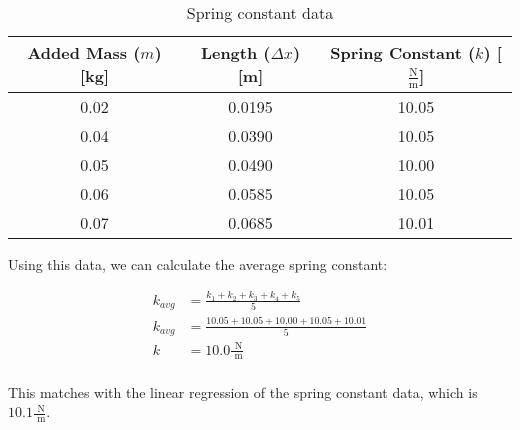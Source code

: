 \documentclass{article}
\begin{document}
            
            \begin{table}[H]
                \centering
                \begin{tabular}{|c|c|c|}
                    \hline
                    Added Mass ($m$) [kg] & Length ($\Delta x$) [m] & Spring Constant ($k$) [$\frac{\text{N}}{\text{m}}$] \\
                    \hline
                    0.02                  & 0.0195                  & 10.05                                               \\
                    \hline
                    0.04                  & 0.0390                  & 10.05                                               \\
                    \hline
                    0.05                  & 0.0490                  & 10.00                                               \\
                    \hline
                    0.06                  & 0.0585                  & 10.05                                               \\
                    \hline
                    0.07                  & 0.0685                  & 10.01                                               \\
                    \hline
                \end{tabular}
                \caption{Spring constant data}\label{tab:spring-constant-data}
            \end{table}
            
            Using this data, we can calculate the average spring constant:
            
            \begin{equation}
                \begin{aligned}
                    k_{avg} &= \frac{k_1 + k_2 + k_3 + k_4 + k_5}{5} \\
                    k_{avg} &= \frac{10.05 + 10.05 + 10.00 + 10.05 + 10.01}{5} \\
                    k &= 10.0 \frac{\text{ N}}{\text{ m}} \\
                \end{aligned}\label{eq:average spring constant equation}
            \end{equation} %
            
            This matches with the linear regression of the spring constant data, which is $10.1 \frac{\text{ N}}{\text{ m}}$.
        
\end{document}
